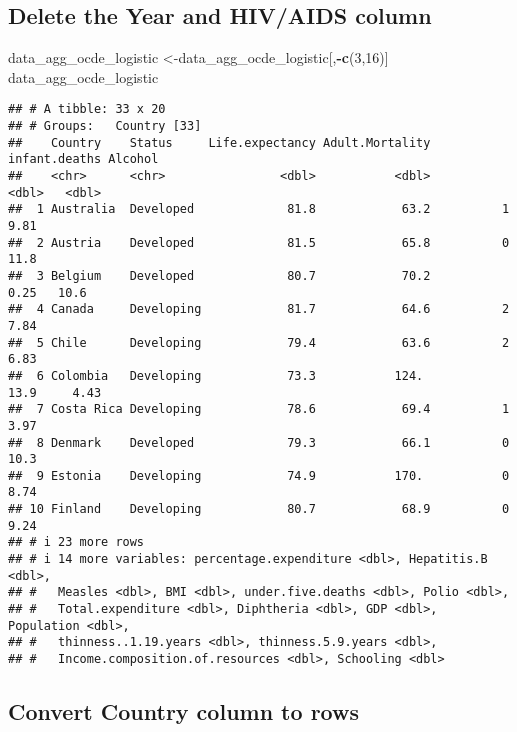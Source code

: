 \documentclass[
]{article}
\newenvironment{Shaded}{\begin{snugshade}}{\end{snugshade}}
\newcommand{\DecValTok}[1]{\textcolor[rgb]{0.00,0.00,0.81}{#1}}
\newcommand{\FunctionTok}[1]{\textcolor[rgb]{0.13,0.29,0.53}{\textbf{#1}}}
\newcommand{\NormalTok}[1]{#1}
\newcommand{\OtherTok}[1]{\textcolor[rgb]{0.56,0.35,0.01}{#1}}
\newcommand{\SpecialCharTok}[1]{\textcolor[rgb]{0.81,0.36,0.00}{\textbf{#1}}}
\begin{document}
\subsection{Delete the Year and HIV/AIDS
column}\label{delete-the-year-and-hivaids-column}

\begin{Shaded}
\begin{Highlighting}[]
\NormalTok{data\_agg\_ocde\_logistic }\OtherTok{\textless{}{-}}\NormalTok{data\_agg\_ocde\_logistic[,}\SpecialCharTok{{-}}\FunctionTok{c}\NormalTok{(}\DecValTok{3}\NormalTok{,}\DecValTok{16}\NormalTok{)]  }
\NormalTok{data\_agg\_ocde\_logistic}
\end{Highlighting}
\end{Shaded}

\begin{verbatim}
## # A tibble: 33 x 20
## # Groups:   Country [33]
##    Country    Status     Life.expectancy Adult.Mortality infant.deaths Alcohol
##    <chr>      <chr>                <dbl>           <dbl>         <dbl>   <dbl>
##  1 Australia  Developed             81.8            63.2          1       9.81
##  2 Austria    Developed             81.5            65.8          0      11.8 
##  3 Belgium    Developed             80.7            70.2          0.25   10.6 
##  4 Canada     Developing            81.7            64.6          2       7.84
##  5 Chile      Developing            79.4            63.6          2       6.83
##  6 Colombia   Developing            73.3           124.          13.9     4.43
##  7 Costa Rica Developing            78.6            69.4          1       3.97
##  8 Denmark    Developed             79.3            66.1          0      10.3 
##  9 Estonia    Developing            74.9           170.           0       8.74
## 10 Finland    Developing            80.7            68.9          0       9.24
## # i 23 more rows
## # i 14 more variables: percentage.expenditure <dbl>, Hepatitis.B <dbl>,
## #   Measles <dbl>, BMI <dbl>, under.five.deaths <dbl>, Polio <dbl>,
## #   Total.expenditure <dbl>, Diphtheria <dbl>, GDP <dbl>, Population <dbl>,
## #   thinness..1.19.years <dbl>, thinness.5.9.years <dbl>,
## #   Income.composition.of.resources <dbl>, Schooling <dbl>
\end{verbatim}

\subsection{Convert Country column to
rows}\label{convert-country-column-to-rows}
\end{document}
